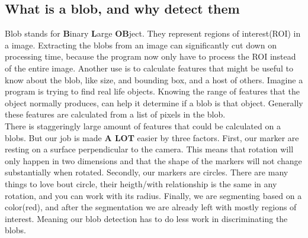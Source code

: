 \subsection{What is a blob, and why detect them}
Blob stands for \textbf{B}inary \textbf{L}arge \textbf{OB}ject. They represent regions of interest(ROI) in a image. Extracting the blobs from an image can significantly cut down on processing time, because the program now only have to process the ROI instead of the entire image. Another use is to calculate features that might be useful to know about the blob, like size, and bounding box, and a host of others. Imagine a program is trying to find real life objects. Knowing the range of features that the object normally produces, can help it determine if a blob is that object. Generally these features are calculated from a list of pixels in the blob.\\
There is staggeringly large amount of features that could be calculated on a blobs. But our job is made \textbf{A LOT} easier by three factors. First, our marker are resting on a surface perpendicular to the camera. This means that rotation will only happen in two dimensions and that the shape of the markers will not change substantially when rotated. Secondly, our markers are circles. There are many things to love bout circle, their heigth/with relationship is the same in any rotation, and you can work with its radius. Finally, we are segmenting based on a color(red), and after the segmentation we are already left with mostly regions of interest. Meaning our blob detection has to do less work in discriminating the blobs.
